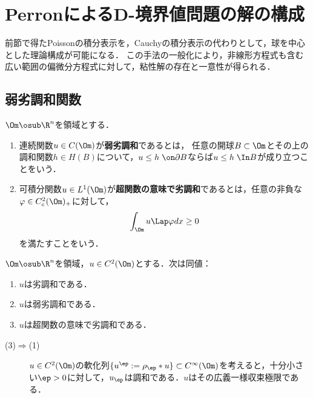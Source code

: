 \documentclass[uplatex,dvipdfmx]{jsreport}
\begin{document}
\section{PerronによるD-境界値問題の解の構成}

\begin{tcolorbox}[colframe=ForestGreen, colback=ForestGreen!10!white,breakable,colbacktitle=ForestGreen!40!white,coltitle=black,fonttitle=\bfseries\sffamily,
title=]
    前節で得たPoissonの積分表示を，Cauchyの積分表示の代わりとして，球を中心とした理論構成が可能になる．
    この手法の一般化により，非線形方程式も含む広い範囲の偏微分方程式に対して，粘性解の存在と一意性が得られる．
\end{tcolorbox}

\subsection{弱劣調和関数}

\begin{definition}
    $\Om\osub\R^n$を領域とする．
    \begin{enumerate}
        \item 連続関数$u\in C(\Om)$が\textbf{弱劣調和}であるとは，
        任意の開球$B\subset\Om$とその上の調和関数$h\in H(B)$について，$u\le h\;\on\partial B$ならば$u\le h\;\In B$が成り立つことをいう．
        \item 可積分関数$u\in L^1(\Om)$が\textbf{超関数の意味で劣調和}であるとは，任意の非負な$\varphi\in C^2_c(\Om)_+$に対して，
        \[\int_\Om u\Lap\varphi dx\ge0\]
        を満たすことをいう．
    \end{enumerate}
\end{definition}

\begin{proposition}
    $\Om\osub\R^n$を領域，$u\in C^2(\Om)$とする．次は同値：
    \begin{enumerate}
        \item $u$は劣調和である．
        \item $u$は弱劣調和である．
        \item $u$は超関数の意味で劣調和である．
    \end{enumerate}
\end{proposition}
\begin{Proof}\mbox{}
    \begin{description}
        \item[(3)$\Rightarrow$(1)] $u\in C^2(\Om)$の軟化列$\{u^\ep:=\rho_\ep*u\}\subset C^\infty(\Om)$を考えると，十分小さい$\ep>0$に対して，$u_\ep$は調和である．$u$はその広義一様収束極限である．
    \end{description}
\end{Proof}
\end{document}
